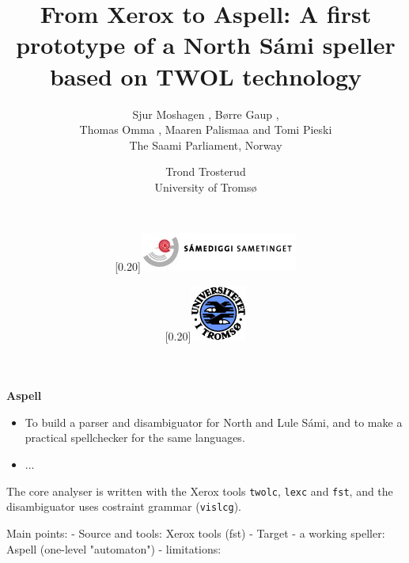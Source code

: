 \documentclass[landscape,english,11pt]{seminar}
\title{From Xerox to Aspell: A first prototype of a North Sámi speller
 based on TWOL technology}
\author{Sjur Moshagen
, Børre Gaup
, \\Thomas Omma  
, Maaren Palismaa 
and Tomi Pieski\\ 
 The Saami Parliament, Norway
\and Trond Trosterud\\ University of Tromsø
\and \\
\and \scalebox{0.20}[0.20]{\includegraphics{samediggi.jpg}}
\and \scalebox{0.20}[0.20]{\includegraphics{logoWeb070.jpg}}
}
\begin{document}
\begin{slide}

\maketitle


\newslide

\textbf{Aspell}

\begin{itemize}
\item To build a parser and disambiguator for North and Lule Sámi, and to make a practical spellchecker for the same languages.
\item ...
\end{itemize}


  The core analyser is written with the Xerox tools \texttt{twolc}, \texttt{lexc} and \texttt{fst}, and the disambiguator uses costraint grammar (\texttt{vislcg}).

\newslide

Main points:
- Source and tools: Xerox tools (fst)
- Target - a working speller: Aspell (one-level "automaton")
- limitations:

\end{slide}
\end{document}
